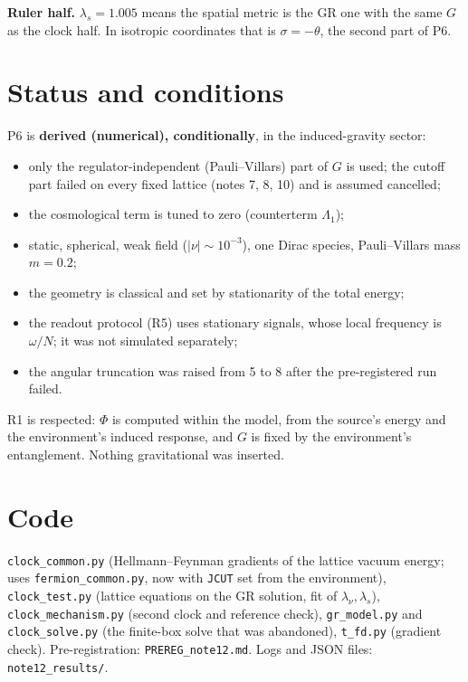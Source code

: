 \documentclass[11pt]{article}
\begin{document}
\textbf{Ruler half.} $\lambda_s=1.005$ means the spatial metric is the GR one with the same $G$ as the clock half. In isotropic coordinates that is $\sigma=-\theta$, the second part of P6.

\section{Status and conditions}
P6 is \textbf{derived (numerical), conditionally}, in the induced-gravity sector:
\begin{itemize}
\item only the regulator-independent (Pauli--Villars) part of $G$ is used; the cutoff part failed on every fixed lattice (notes 7, 8, 10) and is assumed cancelled;
\item the cosmological term is tuned to zero (counterterm $\Lambda_1$);
\item static, spherical, weak field ($|\nu|\sim10^{-3}$), one Dirac species, Pauli--Villars mass $m=0.2$;
\item the geometry is classical and set by stationarity of the total energy;
\item the readout protocol (R5) uses stationary signals, whose local frequency is $\omega/N$; it was not simulated separately;
\item the angular truncation was raised from 5 to 8 after the pre-registered run failed.
\end{itemize}
R1 is respected: $\Phi$ is computed within the model, from the source's energy and the environment's induced response, and $G$ is fixed by the environment's entanglement. Nothing gravitational was inserted.

\section*{Code}
\texttt{clock\_common.py} (Hellmann--Feynman gradients of the lattice vacuum energy; uses \texttt{fermion\_common.py}, now with \texttt{JCUT} set from the environment), \texttt{clock\_test.py} (lattice equations on the GR solution, fit of $\lambda_\nu,\lambda_s$), \texttt{clock\_mechanism.py} (second clock and reference check), \texttt{gr\_model.py} and \texttt{clock\_solve.py} (the finite-box solve that was abandoned), \texttt{t\_fd.py} (gradient check). Pre-registration: \texttt{PREREG\_note12.md}. Logs and JSON files: \texttt{note12\_results/}.
\end{document}
